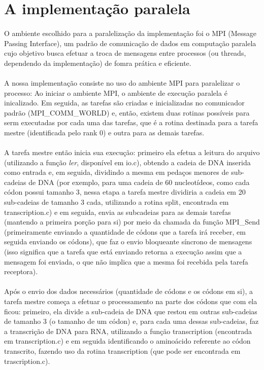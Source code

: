 \documentclass[a4paper,10pt]{article}
\begin{document}
\section{A implementação paralela}
\paragraph{}O ambiente escolhido para a paralelização da implementação foi o MPI (Message Passing Interface), um padrão de comunicação de dados em computação paralela cujo objetivo busca efetuar a troca de mensagens entre processos (ou threads, dependendo da implementação) de fomra prática e eficiente.\\
\paragraph{} A nossa implementação consiste no uso do ambiente MPI para paralelizar o processo: Ao iniciar o ambiente MPI, o ambiente de execução paralela é inicalizado. Em seguida, as tarefas são criadas e inicializadas no comunicador padrão (MPI\_COMM\_WORLD) e, então, existem duas rotinas possíveis para serm executadas por cada uma das tarefas, que é a rotina destinada para a tarefa mestre (identificada pelo rank 0) e outra para as demais tarefas.\\
\paragraph{}A tarefa mestre então inicia sua execução: primeiro ela efetua a leitura do arquivo (utilizando a função \emph{ler}, disponível em io.c), obtendo a cadeia de DNA inserida como entrada e, em seguida, dividindo a mesma em pedaços menores de sub-cadeias de DNA (por exemplo, para uma cadeia de 60 nucleotídeos, como cada códon possui tamanho 3, nessa etapa a tarefa mestre dividiria a cadeia em 20 sub-cadeias de tamanho 3 cada, utilizando a rotina split, encontrada em transcription.c) e em seguida, envia as subcadeias para as demais tarefas (mantendo a primeira porção para si) por meio da chamada da função MPI\_Send (primeiramente enviando a quantidade de códons que a tarefa irá receber, em seguida enviando os códons), que faz o envio bloqueante síncrono de mensagens (isso significa que a tarefa que está enviando retorna a execução assim que a mensagem foi enviada, o que não implica que a mesma foi recebida pela tarefa receptora).\\
\paragraph{}Após o envio dos dados necessários (quantidade de códons e os códons em si), a tarefa mestre começa a efetuar o processamento na parte dos códons que com ela ficou: primeiro, ela divide a sub-cadeia de DNA que restou em outras sub-cadeias de tamanho 3 (o tamanho de um códon) e, para cada uma dessas sub-cadeias, faz a transcrição de DNA para RNA, utilizando a função transcription (encontrada em transcription.c) e em seguida identificando o aminoácido referente ao códon transcrito, fazendo uso da rotina transcription (que pode ser encontrada em trascription.c).\\
\end{document}
